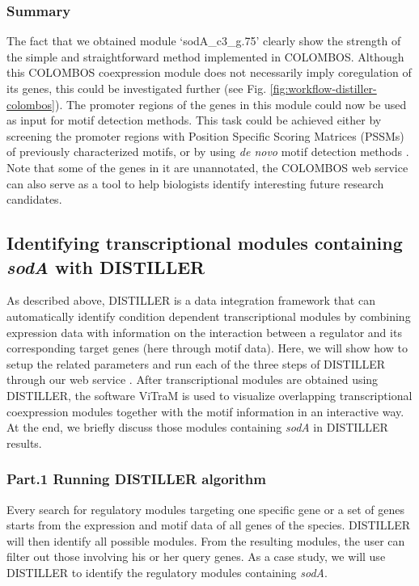 \subsubsection{Summary}

The fact that we obtained module `sodA\_c3\_g.75' clearly show the strength of 
the simple and straightforward method implemented in COLOMBOS. Although this 
COLOMBOS coexpression module does not necessarily imply coregulation of its 
genes, this could be investigated further (see Fig. 
\ref{fig:workflow-distiller-colombos}). 
The promoter regions of the genes in this module could now be used as input for 
motif detection methods. This task could be achieved either by screening the 
promoter regions with Position Specific Scoring Matrices (PSSMs) of previously 
characterized motifs, or by using \textit{de novo} motif detection methods 
\cite{Tompa2005, Storms2010}. 
Note that some of the genes in it are unannotated, the COLOMBOS web service can 
also serve as a tool to help biologists identify interesting future research 
candidates.




\subsection{Identifying transcriptional modules containing \textit{sodA} with 
DISTILLER}

As described above, DISTILLER \cite{Lemmens2009} is a data integration 
framework that can 
automatically identify condition dependent transcriptional modules by combining 
expression data with information on the interaction between a regulator and its 
corresponding target genes (here through motif data). Here, we will show how to 
setup the related parameters and run each of the three steps of DISTILLER 
through our web service \cite{DISTILLER}. 
After transcriptional modules are obtained using DISTILLER, 
the software ViTraM \cite{Sun2009} is used to visualize overlapping 
transcriptional coexpression modules together with the motif information in an 
interactive way. At the end, we briefly discuss those modules containing 
\textit{sodA} in DISTILLER results.

\subsubsection{Part.1 Running DISTILLER algorithm}\label{sec:dist-distmodule}
Every search for regulatory modules targeting one specific gene or a set of 
genes starts from the expression and motif data of all genes of the species. 
DISTILLER will then identify all possible modules. From the resulting modules, 
the user can filter out those involving his or her query genes. As a case 
study, we will use DISTILLER to identify the regulatory modules containing 
\textit{sodA}.

